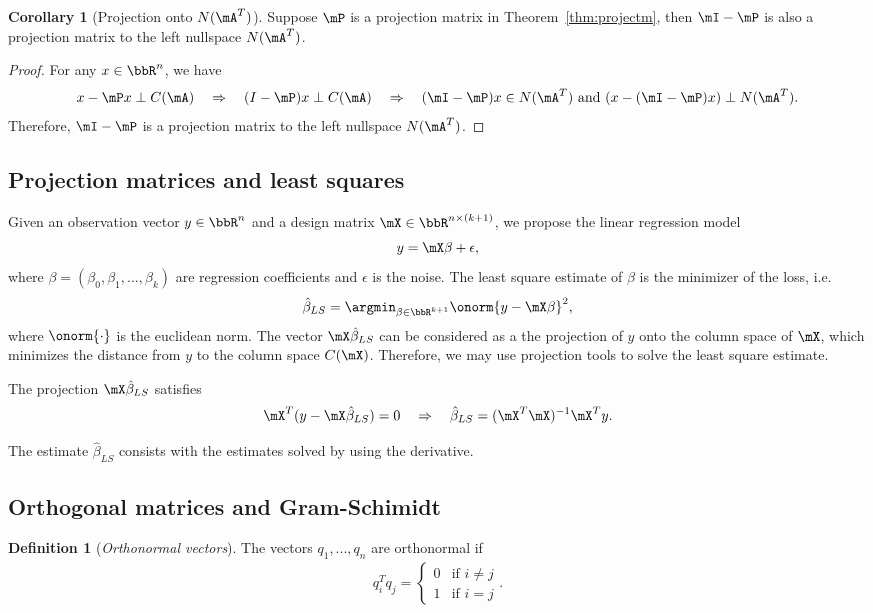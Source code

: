 \documentclass[11pt]{article}
\theoremstyle{plain}
\theoremstyle{definition}
\newtheorem{defn}{Definition}
\newtheorem{cor}{Corollary}
\begin{document}
\begin{cor}[Projection onto $N(\mA^T)$]\label{cor:iprojectm}
	Suppose $\mP$ is a projection matrix in Theorem~\ref{thm:projectm}, then $\mI-\mP$ is also a projection matrix to the left nullspace $N(\mA^T)$. 
\end{cor}

\begin{proof}
	For any $x \in \bbR^n$, we have
	\[ x - \mP x \perp C(\mA) \quad \Rightarrow \quad (I-\mP)x \perp C(\mA) \quad \Rightarrow \quad  (\mI-\mP)x \in N(\mA^T) \text{ and } (x - (\mI-\mP)x) \perp N(\mA^T). \]
	Therefore, $\mI-\mP$ is a projection matrix to the left nullspace $N(\mA^T)$.
\end{proof}

\subsection{Projection matrices and least squares}
Given an observation vector $y \in \bbR^n$ and a design matrix $\mX \in \bbR^{n \times (k+1)}$, we propose the linear regression model
\[ y = \mX \beta +\epsilon,\]
where $\beta = (\beta_0,\beta_1,...,\beta_k)$ are regression coefficients and $\epsilon$ is the noise. The least square estimate of $\beta$ is the minimizer of the loss, i.e.\
\[  \hat \beta_{LS} = \argmin_{\beta \in \bbR^{k+1}} \onorm{y - \mX \beta}^2, \]
where $\onorm{\cdot}$ is the euclidean norm. The vector $\mX 
\hat \beta_{LS}$ can be considered as a the projection of $y$ onto the column space of $\mX$, which minimizes the distance from $y$ to the column space $C(\mX)$. Therefore, we may use projection tools to solve the least square estimate. 

The projection $\mX \hat \beta_{LS}$ satisfies
\[ \mX^T( y - \mX \hat \beta_{LS} ) = 0 \quad \Rightarrow \quad \hat \beta_{LS} = (\mX^T \mX)^{-1} \mX^T y. \]

The estimate $\hat \beta_{LS}$ consists with the estimates solved by using the derivative. 

\subsection{Orthogonal matrices and Gram-Schimidt}
\begin{defn}[\textit{Orthonormal vectors}]\label{def:othronov}
	The vectors $q_1,...,q_n$ are orthonormal if
	\begin{align}
		q_i^T q_j = \begin{cases}
			0& \text{if } i\neq j\\
			1 & \text{if } i =  j
		\end{cases}.
	\end{align}
\end{defn}
\end{document}
